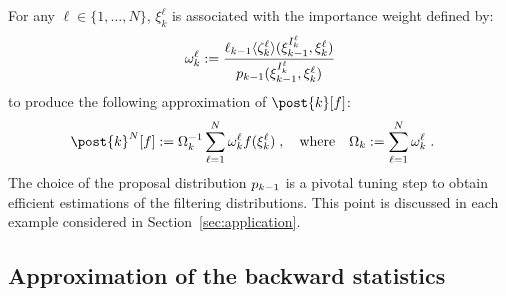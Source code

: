 \documentclass[12pt]{article}
\newcommand{\N}{N}
\newcommand{\kissforward}[3][]
{\ifthenelse{\equal{#1}{}}{p_{#2}}
{\ifthenelse{\equal{#1}{fully}}{p^{\star}_{#2}}
{\ifthenelse{\equal{#1}{smooth}}{\tilde{r}_{#2}}{\mathrm{erreur}}}}}
\newcommand{\eqdef}{\ensuremath{:=}}
\newcommand{\eqsp}{\;}
\newcommand{\ewght}[2]{\ensuremath{\omega_{#1}^{#2}}}
\newcommand{\epart}[2]{\ensuremath{\xi_{#1}^{#2}}}
\newcommand{\sumwght}[2][]{%
\ifthenelse{\equal{#1}{}}{\ensuremath{\Omega_{#2}}}{\ensuremath{\Omega_{#2}^{(#1)}}}}
\newcommand{\hatqg}[1]{\mathsf{\ell}_{#1}}
\newcounter{example}[section]
\begin{document}
For any  $\ell \in\{1, \dots, \N\}$, $\epart{k}{\ell}$ is associated with the  importance weight defined by:
\begin{equation}
\label{eq:weight-update-filtering}
    \ewght{k}{\ell} \eqdef \frac{\hatqg{k-1}\langle\zeta_k^{\ell}\rangle(\epart{k-1}{I_k^{\ell}},\epart{k}{\ell}) }{ \kissforward{k-1}{k-1}(\epart{k-1}{I_k^{\ell}},\epart{k}{\ell})}
\end{equation}
to produce the following approximation of $\post{k}[f]$:
\begin{align*}
\post{k}^\N[f]&\eqdef \sumwght{k}^{-1}\sum_{\ell=1}^N \ewght{k}{\ell}f(\epart{k}{\ell})\eqsp,\quad\mbox{where}\quad\sumwght{k}\eqdef \sum_{\ell=1}^\N \ewght{k}{\ell}\eqsp.
\end{align*}
The choice of the proposal distribution $\kissforward{k-1}{k-1}$ is a pivotal tuning step to obtain efficient estimations of the filtering distributions.  This point is discussed in each example considered in Section~\ref{sec:application}.


\subsection{Approximation of the backward statistics}
\label{sec:smoothing}
\end{document}
